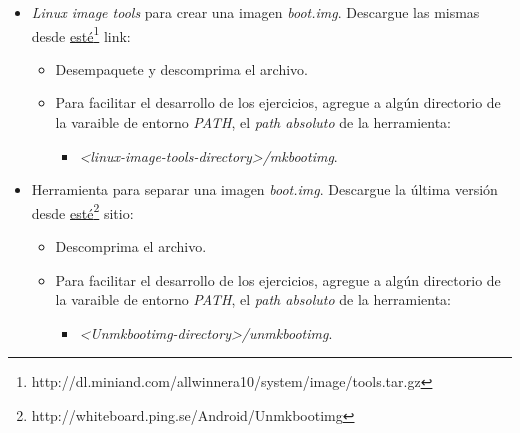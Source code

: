 \begin{itemize}
\begin{itemize}
      \item Acceda al \textit{Android SDK Manager}:
      \begin{lstlisting}
# android sdk
      \end{lstlisting}
     
      \item Descargue e instale/actualice los siguientes paquetes:
      \begin{itemize}
	\item \textit{Android SDK Tools}.
	\item \textit{Android SDK Platform-tools}.
	\item \textit{Android SDK Build-tools}.
	\item Android 4.4.2 (API 19) $\rightarrow$ \textit{SDK Platform}.
	\item Android 4.4.2 (API 19) $\rightarrow$ \textit{Intel x86 Atom System Image}.
      \end{itemize}
 \end{itemize}
 
 \item \textit{Linux image tools} para crear una imagen \textit{boot.img}. Descargue las mismas desde \href{http://dl.miniand.com/allwinnera10/system/image/tools.tar.gz}{esté}\footnote{http://dl.miniand.com/allwinnera10/system/image/tools.tar.gz} link:
 \begin{itemize}
      \item Desempaquete y descomprima el archivo.

      \item Para facilitar el desarrollo de los ejercicios, agregue a algún directorio de la varaible de entorno \textit{PATH}, el \textit{path absoluto} de la herramienta:
      \begin{itemize}
	\item \textit{<linux-image-tools-directory>/mkbootimg}.
      \end{itemize}
 \end{itemize}
 
 \item Herramienta para separar una imagen \textit{boot.img}. Descargue la última versión desde \href{http://whiteboard.ping.se/Android/Unmkbootimg}{esté}\footnote{http://whiteboard.ping.se/Android/Unmkbootimg} sitio:
 \begin{itemize}
      \item Descomprima el archivo.

      \item Para facilitar el desarrollo de los ejercicios, agregue a algún directorio de la varaible de entorno \textit{PATH}, el \textit{path absoluto} de la herramienta:
      \begin{itemize}
	\item \textit{<Unmkbootimg-directory>/unmkbootimg}.
      \end{itemize}
 \end{itemize}
 

\end{itemize}
